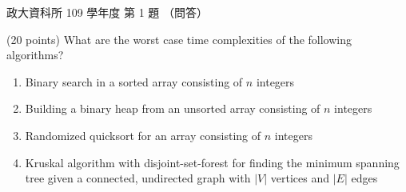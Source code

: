 \begin{pastexam}[label={px:nccu-109-dsa-01}]{政大資科所 109 學年度 第 1 題}
（問答）

(20 points) What are the worst case time complexities of the following algorithms?
\begin{enumerate}[label=1.\arabic*]
\item Binary search in a sorted array consisting of $n$ integers
\item Building a binary heap from an unsorted array consisting of $n$ integers
\item Randomized quicksort for an array consisting of $n$ integers
\item Kruskal algorithm with disjoint-set-forest for finding the minimum spanning tree given a
connected, undirected graph with $|V|$ vertices and $|E|$ edges
\end{enumerate}
\end{pastexam}

